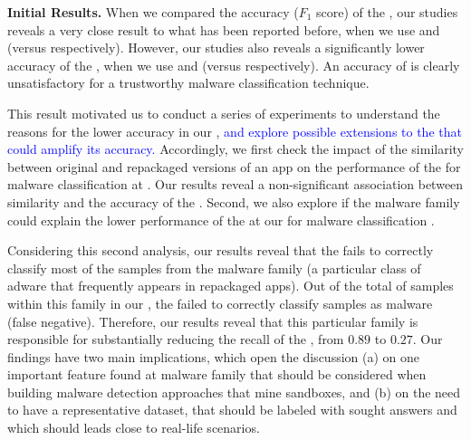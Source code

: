 {\bf Initial Results.} When we compared the accuracy ($F_1$ score) of the \mas, our studies reveals a very close result to what has been reported before, when we use \sds and \nds  (\fscoreSmall versus \nfscoreSmall respectively). However, our studies also reveals a significantly lower accuracy of the \mas, when we use \sds and \cds (\fscoreSmall versus \fscore respectively). An accuracy of \fscore is clearly unsatisfactory for a trustworthy malware classification technique. 

This result motivated us to conduct a series of experiments 
to understand the reasons for the lower accuracy in our \cds, \textcolor{blue}{and explore possible extensions to the \mas that could amplify its accuracy.}
Accordingly, we first check the impact of the similarity between original and repackaged versions of
an app on the performance of the \mas for malware classification at \sds. Our results reveal a non-significant association between similarity and the accuracy of the \mas. 
Second, we also explore if the
malware family could explain the lower performance of the \mas at our \cds for malware classification .

Considering this second analysis, our results reveal that the \mas fails to correctly classify most of the samples from
the \gps malware family (a particular class of adware that frequently appears in repackaged apps). 
Out of the total of \appsGps samples within this family in our \cds, the \mas failed to correctly classify \appsGpsFN samples as malware (false negative).
Therefore, our results reveal that this particular family is responsible for substantially reducing the recall of the \mas, from $0.89$ to $0.27$.
Our findings have two main implications, which open the discussion (a) on one important feature found at \gps malware family that should be
considered when building malware detection approaches that mine sandboxes, and (b) on the need to have a representative dataset, that should be labeled with sought
answers and which should leads close to real-life scenarios.
  


